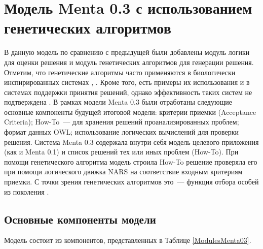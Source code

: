 \section{Модель Menta 0.3 с использованием генетических алгоритмов} \label{chapt2}
В данную модель по сравнению с предыдущей были добавлены модуль логики для оценки решения и модуль генетических алгоритмов для генерации решения. Отметим, что генетические алгоритмы часто применяются в биологически инспирированных системах \cite{G1}, \cite{G3}. Кроме того, есть примеры их использования и в системах поддержки принятия решений, однако эффективность таких систем не подтверждена \cite{G2}. В рамках модели Menta 0.3 были отработаны следующие основные компоненты будущей итоговой модели: критерии приемки (Acceptance Criteria); How-To~--- для хранения решений проанализированных проблем; формат данных OWL; использование логических вычислений для проверки решения. Система Menta 0.3 содержала внутри себя модель целевого приложения (как и Menta 0.1) и список решений тех или иных проблем (How-To). При помощи генетического алгоритма модель строила How-To решение проверяла его при помощи логического движка NARS \cite{NARS} на соответствие входным критериям приемки. С точки зрения генетических алгоритмов это~--- функция отбора особей из поколения \cite{GFITNESS}. 

\subsection{Основные компоненты модели}
Модель состоит из компонентов, представленных в Таблице \ref{ModulesMenta03}.


